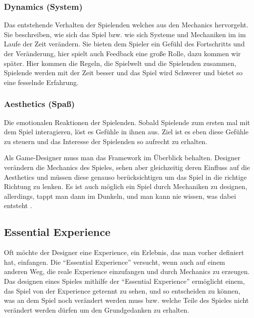 \subsubsection{Dynamics (System)}

Das entstehende Verhalten der Spielenden welches aus den Mechanics hervorgeht\cite{_mda}. Sie beschreiben, wie sich das Spiel bzw. wie sich Systeme und Mechaniken im  im Laufe der Zeit verändern. Sie bieten dem Spieler ein Gefühl des Fortschritts und der Veränderung, hier spielt auch Feedback eine große Rolle, dazu kommen wir später. Hier kommen die Regeln, die Spielwelt und die Spielenden zusammen, Spielende werden mit der Zeit besser und das Spiel wird Schwerer und bietet so eine fesselnde Erfahrung.

\subsubsection{Aesthetics (Spaß)}

Die emotionalen Reaktionen der Spielenden. Sobald Spielende zum ersten mal mit dem Spiel interagieren, löst es Gefühle in ihnen aus. Ziel ist es eben diese Gefühle zu steuern und das Interesse der Spielenden so aufrecht zu erhalten.\newline

\noindent Als Game-Designer muss man das Framework im Überblick behalten. Designer verändern die Mechanics des Spieles, sehen aber gleichzeitig deren Einfluss auf die Aesthetics und müssen diese genauso berücksichtigen um das Spiel in die richtige Richtung zu lenken. 
Es ist auch möglich ein Spiel durch Mechaniken zu designen, allerdings, tappt man dann im Dunkeln, und man kann nie wissen, was dabei entsteht \cite[S.56]{_art_of_gamedesign}.

\subsection{Essential Experience}

Oft möchte der Designer eine Experience, ein Erlebnis, das man vorher definiert hat, einfangen. Die "`Essential Experience"' versucht, wenn auch auf einem anderen Weg, die reale Experience einzufangen und durch Mechanics zu erzeugen. Das designen eines Spieles mithilfe der "`Essential Experience"' ermöglicht einem, das Spiel von der Experience getrennt zu sehen, und so entscheiden zu können, was an dem Spiel noch verändert werden muss bzw. welche Teile des Spieles nicht verändert werden dürfen um den Grundgedanken zu erhalten\cite[S.55]{_art_of_gamedesign}.

